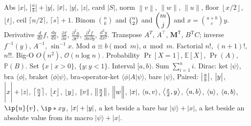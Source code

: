 \documentclass{article}
\DeclarePairedDelimiter{\absv}{\lvert}{\rvert}
\DeclarePairedDelimiter{\pceil}{\lceil}{\rceil}
\DeclarePairedDelimiter\pfloor{\lfloor}{\rfloor}
\DeclarePairedDelimiter{\nrm}{\lVert}{\rVert}
\DeclarePairedDelimiter{\fcomp}{\lvert}{\rvert}
\DeclarePairedDelimiter{\inner}{\langle}{\rangle}
\DeclarePairedDelimiter{\gen}{\langle}{\rangle}
\newcommand{\abs}[1]{\left|#1\right|}
\newcommand{\card}[1]{\lvert #1\rvert}
\newcommand{\norm}[1]{\left\| #1 \right\|}
\newcommand{\floor}[1]{\left\lfloor #1 \right\rfloor}
\newcommand{\ceil}[1]{\lceil #1 \rceil}
\newcommand{\E}{\mathbb{E}}
\newcommand{\Prob}{\Pr}
\newcommand{\PP}{\mathbb{P}}
\newcommand{\ket}[1]{| #1 \rangle}
\newcommand{\bra}[1]{\langle #1 |}
\newcommand{\braket}[2]{\langle #1 | #2 \rangle}
\begin{document}
Abs $\abs{x}$, $\abs{\frac{a}{b}} + \abs{y}$, $\absv{x}$, $\lvert y \rvert$, $\left| z \right|$, card $\card{S}$, norm $\norm{v}$,
$\lVert w \rVert$, $\|u\|$, floor $\floor{x/2}$, $\lfloor t \rfloor$, ceil $\ceil{n/2}$, $\lceil s\rceil + 1$.
Binom $\binom{n}{k}$ and $\tbinom{n}{2}$ and $\dbinom{m}{j}$ and $x = \binom{a+b}{c} y$.
Derivative $\frac{d}{dx} f$, $\frac{dy}{dx}$, $\frac{\partial f}{\partial x}$, $\frac{\partial^2 u}{\partial t^2}$,
$\frac{\partial^2 f}{\partial x \partial y}$, $\frac{\mathrm{d}^2 y}{\mathrm{d} x^2}$.
Transpose $A^T$, $A^\top$, $\mathbf{M}^{\mathsf{T}}$, $B^{\mathrm{T}} C$; inverse $f^{-1}(y)$, $A^{-1}$, $\sin^{-1} x$.
Mod $a \equiv b \pmod{m}$, $a \bmod m$. Factorial $n!$, $(n+1)!$, $n!!$. Big-O $O(n^2)$, $\mathcal{O}(n \log n)$.
Probability $\Pr[X = 1]$, $\E[X]$, $\Prob(A)$, $\PP(B)$. Set $\{x \mid x > 0\}$, $\{ y : y < 1\}$.
Interval $[a, b)$. Sum $\sum_{i=1}^n i$.
Dirac: ket $\ket{\psi}$, bra $\bra{\phi}$, braket $\braket{\phi}{\psi}$, bra-operator-ket $\bra{\phi} A \ket{\psi}$,
bare $|\psi\rangle$,
Paired: $\absv*{\frac{a}{b}}$, $\absv[\big]{y}$, $\absv[\Bigg]{x} + \absv{z}$, $\pceil*{\frac{n}{2}}$, $\pfloor[\big]{x}$,
$\pfloor{y}$, $\nrm{v}$, $\nrm*{\frac{u}{2}}$, $\nrm[\Big]{w}$, $\fcomp*{x}$, $\inner{u, v}$, $\inner*{\frac{x}{2}, y}$,
$\inner[\big]{a, b}$, $\inner{u}$, $\gen{a, b}$, $\ip{u}{v}$, $\ip*{x}{y}$, $\absv*{x} + |y|$, a ket beside a bare bar $\ket{\psi} + |x|$, a ket beside an absolute value from its macro $\ket{\psi} + \abs{x}$.
\end{document}
